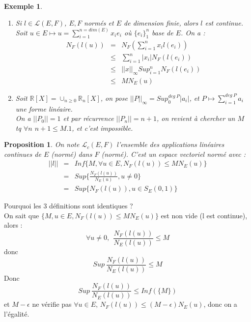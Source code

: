 \documentclass[a4paper, oneside]{report}
\theoremstyle{break}
\newtheorem{propo}[thm]{Proposition}
\newtheorem{exem}[thm]{Exemple}
\newcommand{\R}{\mathbb{R}}
\renewcommand{\L}{\mathcal{L}}
\newcommand{\evn}{espace vectoriel normé }
\newcommand{\aplins}{applications linéaires }
\begin{document}
\begin{exem}

\begin{enumerate}
\item Si $l\in \mathcal{L}(E,F)$, $E,F$ normés et $E$ de dimension finie, alors $l$ est continue.\\
Soit $u\in E\mapsto  u=\sum_{i=1}^{n=dim(E)}x_ie_i$ où $\{e_i\}^n_1$ base de $E$. On a :
$$\begin{array}{lll}
N_F(l(u))&=&N_F(\sum_{i=1}^{n}x_il(e_i))\\
&\leq & \sum_{i=1}^n |x_i| N_F(l(e_i))\\
&\leq & ||x||_\infty Sup_{i=1}^n N_F(l(e_i))\\
& \leq & M N_E(u)
\end{array}$$

\item Soit $\R[X]=\cup_{n\geq 0}\R_n[X]$, on pose $||P||_\infty = Sup_0^{deg~P}|a_i|$, et $P\mapsto \sum_{i=1}^{deg~P}a_i$ une forme linéaire.\\
On a $||P_0||=1$ et par récurrence $||P_n||=n+1$, on revient à chercher un $M$ tq $\forall n$ $n+1\leq M.1$, et c'est impossible.
\end{enumerate}
\end{exem}

\begin{propo}
On note $\L_c(E,F)$ l'ensemble des \aplins continues de $E$ (normé) dans $F$ (normé). C'est un \evn avec :
$$\begin{array}{lll}
||l||&=& Inf\{M, \forall u \in E, N_F(l(u))\leq M N_E(u) \}\\
&=& Sup\{\frac{N_F(l(u))}{N_E(u)}, u\neq 0 \}\\
&=& Sup\{N_F(l(u)), u \in S_E(0,1) \}
\end{array}$$
\end{propo}

Pourquoi les 3 définitions sont identiques ?\\
On sait que $\{M, u \in E, N_F(l(u))\leq M N_E(u) \}$ est non vide (l est continue), alors :
$$\forall u \neq 0,~~\frac{N_F(l(u))}{N_E(l(u))}\leq M$$
donc 
$$Sup~\frac{N_F(l(u))}{N_E(l(u))}\leq M$$
Donc 
$$Sup~\frac{N_F(l(u))}{N_E(l(u))}\leq Inf(\{M\})$$
et $M-\epsilon$ ne vérifie pas $\forall u \in E$, $N_F(l(u))\leq (M-\epsilon) N_E(u)$, donc on a l'égalité.
\end{document}
